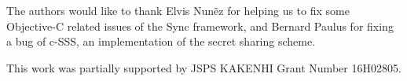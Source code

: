\documentclass[a4paper,11pt]{report}
\begin{document}
The authors would like to thank Elvis Nun{\~e}z for helping us to fix some Objective-C related issues of the Sync framework, and Bernard Paulus for fixing a bug of c-SSS, an implementation of the secret sharing scheme.

This work was partially supported by JSPS KAKENHI Grant Number 16H02805.

\newpage

\renewcommand{\bibname}{Bibliography}
%
%


 
\end{document}
